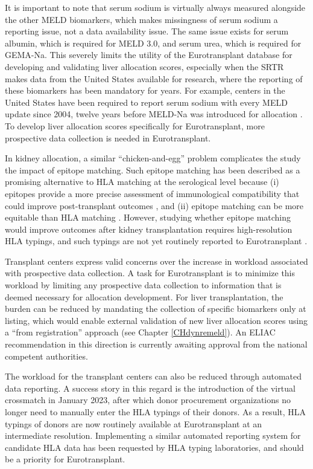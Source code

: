 \documentclass[11pt,twoside,]{book}
\begin{document}
It is important to note
that serum sodium is virtually always measured alongside the other MELD biomarkers,
which makes missingness of serum sodium a reporting issue, not a data
availability issue.
The same issue exists for serum albumin, which is required for MELD 3.0,
and serum urea, which is required for GEMA-Na. This severely
limits the utility of the Eurotransplant database for developing and validating
liver allocation scores, especially when the SRTR makes data from the United
States available for research, where the reporting of these biomarkers has been
mandatory for years. For example, centers in the United States have been required
to report serum sodium with every MELD update since 2004, twelve years before
MELD-Na was introduced for allocation \citep{unos2014liver}. To develop liver allocation scores
specifically for Eurotransplant, more prospective data collection is needed
in Eurotransplant.

In kidney allocation, a similar ``chicken-and-egg'' problem complicates the study
the impact of epitope matching. Such epitope matching has been described as a promising
alternative to HLA matching at the serological level because (i) epitopes
provide a more precise assessment of immunological compatibility that could
improve post-transplant outcomes \citep{Niemann2021}, and (ii) epitope
matching can be more equitable than HLA matching \citep{Mankowski2024}. However, studying
whether epitope matching would improve outcomes after kidney transplantation
requires high-resolution HLA typings, and such typings are not yet routinely reported
to Eurotransplant \citep{Karahan2025}.

Transplant centers express valid concerns over the increase in workload associated
with prospective data collection. A task for Eurotransplant
is to minimize this workload by limiting any prospective data collection to
information that is deemed necessary for allocation development. For liver transplantation,
the burden can be reduced by mandating the collection of specific biomarkers only
at listing, which would enable external validation of new liver allocation scores
using a ``from registration'' approach (see Chapter \ref{CHdynremeld}).
An ELIAC recommendation in this direction is currently awaiting approval from
the national competent authorities.

The workload for the transplant centers can also be reduced through automated
data reporting. A success story in this regard is the introduction of
the virtual crossmatch in January 2023, after which donor procurement
organizations no longer need to manually enter the HLA typings of their donors.
As a result, HLA typings of donors are now routinely available at Eurotransplant
at an intermediate resolution. Implementing a similar automated reporting system
for candidate HLA data has been requested by HLA typing laboratories, and
should be a priority for Eurotransplant.
\end{document}
